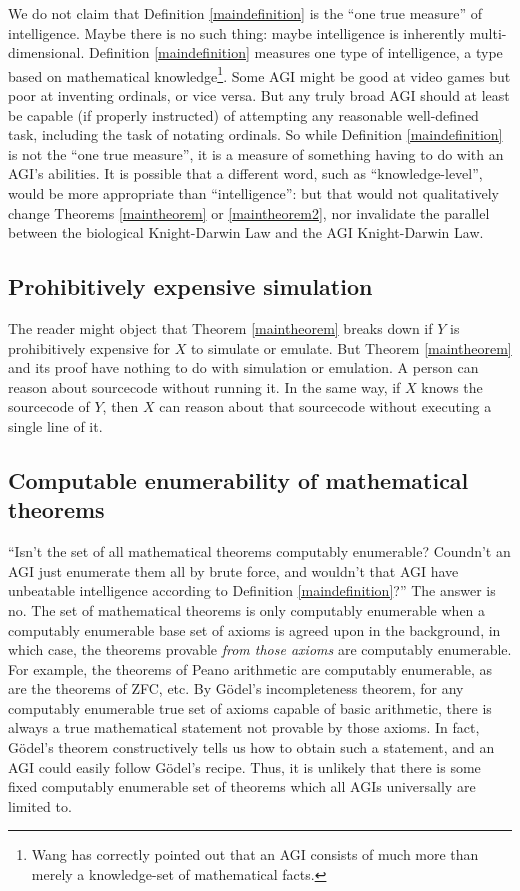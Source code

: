 \documentclass[runningheads]{llncs}
\begin{document}
We do not claim that Definition \ref{maindefinition} is the ``one true measure'' of
intelligence. Maybe there is no such thing: maybe intelligence is inherently
multi-dimensional. Definition \ref{maindefinition} measures one type of
intelligence, a type based on mathematical knowledge\footnote{Wang has
correctly pointed out \cite{wang2007} that an AGI consists of much more than merely
a knowledge-set of mathematical facts.}. Some AGI might be good at video games
but poor at inventing ordinals,
or vice versa. But any truly broad AGI should at least be capable (if properly
instructed) of attempting any reasonable well-defined task, including the task of
notating ordinals.
So while Definition \ref{maindefinition} is not the ``one true measure'', it is a
measure of something having to do with an AGI's abilities. It is possible that
a different word, such as
``knowledge-level'', would be more appropriate than ``intelligence'': but
that would not qualitatively change
Theorems \ref{maintheorem} or \ref{maintheorem2}, nor
invalidate the parallel between the biological Knight-Darwin Law and the
AGI Knight-Darwin Law.

\subsection{Prohibitively expensive simulation}

The reader might object that Theorem \ref{maintheorem} breaks down if $Y$ is prohibitively
expensive for $X$ to simulate or emulate. But Theorem \ref{maintheorem} and its
proof have nothing to do with simulation or emulation. A person can reason about sourcecode
without running it. In the same way, if $X$ knows the sourcecode
of $Y$, then $X$ can reason about that sourcecode without executing a single line
of it.

\subsection{Computable enumerability of mathematical theorems}

``Isn't the set of all mathematical theorems computably enumerable?
Coundn't an AGI just enumerate them all by brute force, and wouldn't that AGI have
unbeatable intelligence according to Definition \ref{maindefinition}?'' The answer is no.
The set of mathematical theorems is only computably enumerable when a computably
enumerable base set of axioms is agreed upon in the background, in which case,
the theorems provable \emph{from those axioms} are computably enumerable.
For example, the
theorems of Peano arithmetic are computably enumerable, as are the theorems of
ZFC, etc. By G\"odel's incompleteness theorem, for any computably
enumerable true set of axioms capable of basic arithmetic, there is always a
true mathematical statement not provable by
those axioms. In fact, G\"odel's theorem constructively tells us how to obtain such a
statement, and an AGI could easily follow G\"odel's recipe.
Thus, it is unlikely that there is some fixed computably enumerable
set of theorems which all AGIs universally are limited to.
\end{document}
